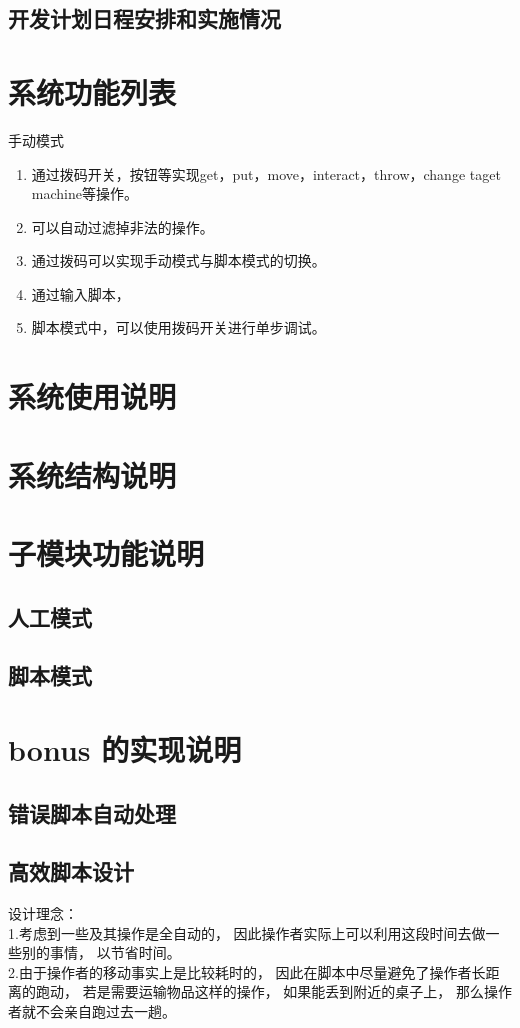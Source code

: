 \documentclass[12pt, a4paper]{ctexart}
\begin{document}
\subsection{开发计划日程安排和实施情况}

\section{系统功能列表}
手动模式
\begin{enumerate}
	\item 通过拨码开关，按钮等实现get，put，move，interact，throw，change taget machine等操作。
	\item 可以自动过滤掉非法的操作。
	\item 通过拨码可以实现手动模式与脚本模式的切换。
	\item 通过输入脚本，
	\item 脚本模式中，可以使用拨码开关进行单步调试。
\end{enumerate}

\section{系统使用说明}

\section{系统结构说明}

\section{子模块功能说明}
\subsection{人工模式}

\subsection{脚本模式}

\section{bonus 的实现说明}
\subsection{错误脚本自动处理}

\subsection{高效脚本设计}
设计理念：\\
1.考虑到一些及其操作是全自动的，
因此操作者实际上可以利用这段时间去做一些别的事情，
以节省时间。\\
2.由于操作者的移动事实上是比较耗时的，
因此在脚本中尽量避免了操作者长距离的跑动，
若是需要运输物品这样的操作，
如果能丢到附近的桌子上，
那么操作者就不会亲自跑过去一趟。
\end{document}
